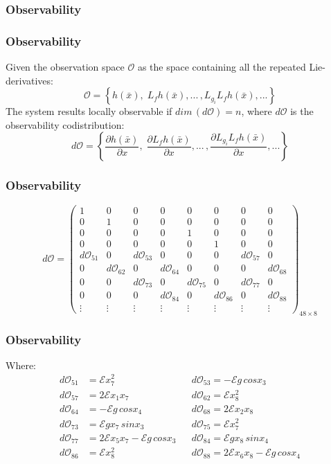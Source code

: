 \subsubsection{Observability}
\begin{frame}
\frametitle{Observability}
Given the observation space $\mathcal{O}$ as the space containing all the repeated Lie-derivatives:
\[
\mathcal{O} = \left\{h(\bar{x}),\;L_fh(\bar{x}),...\,,L_{g_i}L_fh(\bar{x}),...\right\}
\]
The system results locally observable if $dim\,(d\mathcal{O}) = n$, where $d\mathcal{O}$ is the observability codistribution:
\[
d\mathcal{O} = \left\{\frac{\partial h(\bar{x})}{\partial x},\;\frac{\partial L_fh(\bar{x})}{\partial x},...\,,\frac{\partial L_{g_i}L_fh(\bar{x})}{\partial x},...\right\}
\]
\end{frame}
%
\begin{frame}
\frametitle{Observability}
\begin{equation*}
	d\mathcal{O} =%
	\begin{pmatrix}
		1 &0 &0 &0 &0 &0 &0 &0 \\
		0 &1 &0 &0 &0 &0 &0 &0 \\
		0 &0 &0 &0 &1 &0 &0 &0 \\
		0 &0 &0 &0 &0 &1 &0 &0 \\
	    d\mathcal{O}_{51} &0 &d\mathcal{O}_{53} &0 &0 &0 &d\mathcal{O}_{57} &0 \\
		0 &d\mathcal{O}_{62} &0 &d\mathcal{O}_{64} &0 &0 &0 &d\mathcal{O}_{68} \\
		0 &0 &d\mathcal{O}_{73} &0 &d\mathcal{O}_{75} &0 &d\mathcal{O}_{77} &0 \\
		0 &0 &0 &d\mathcal{O}_{84} &0 &d\mathcal{O}_{86} &0 &d\mathcal{O}_{88} \\
		\vdots &\vdots &\vdots &\vdots &\vdots &\vdots &\vdots &\vdots
	\end{pmatrix}_{48\times8}
\end{equation*}
\end{frame}
%
\begin{frame}
\frametitle{Observability}
Where:
\begin{align*}
d\mathcal{O}_{51} &=\mathcal{E}x^2_7 \nonumber &&
d\mathcal{O}_{53} =-\mathcal{E}g\,cosx_3 \nonumber \\
d\mathcal{O}_{57} &=2\mathcal{E}x_1x_7 \nonumber &&
d\mathcal{O}_{62} =\mathcal{E}x^2_8 \nonumber \\
d\mathcal{O}_{64} &=-\mathcal{E}g\,cosx_4 \nonumber &&
d\mathcal{O}_{68} =2\mathcal{E}x_2x_8 \nonumber \\
d\mathcal{O}_{73} &=\mathcal{E}gx_7\,sinx_3 \nonumber &&
d\mathcal{O}_{75} =\mathcal{E}x^2_7 \nonumber \\
d\mathcal{O}_{77} &=2\mathcal{E}x_5x_7 - \mathcal{E}g\,cosx_3 \nonumber &&
d\mathcal{O}_{84} =\mathcal{E}gx_8\,sinx_4 \nonumber \\
d\mathcal{O}_{86} &=\mathcal{E}x^2_8 \nonumber &&
d\mathcal{O}_{88} =2\mathcal{E}x_6x_8 - \mathcal{E}g\,cosx_4 \nonumber \\
\end{align*}
\end{frame}
